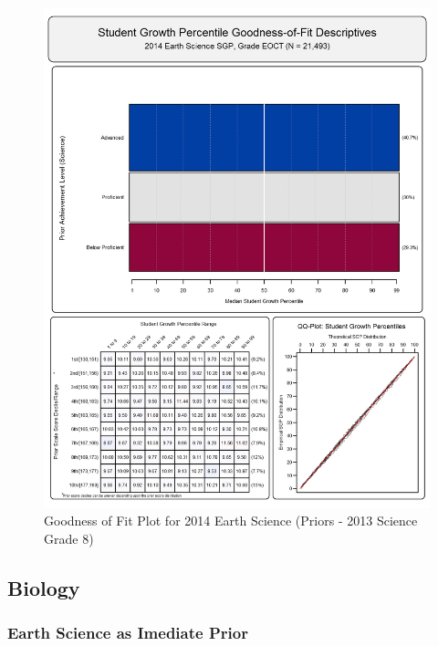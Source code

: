 \documentclass[12pt]{article}
\begin{document}
\begin{figure}[htbp]
\centering
\includegraphics{../img/Goodness_of_Fit/EARTH_SCIENCE.2014/2014_EARTH_SCIENCE_EOCT;2013_SCIENCE_8.png}
\caption{Goodness of Fit Plot for 2014 Earth Science (Priors - 2013
Science Grade 8)}
\end{figure}

\clearpage 

\subsection{Biology}\label{biology}

\subsubsection{Earth Science as Imediate
Prior}\label{earth-science-as-imediate-prior}
\end{document}
